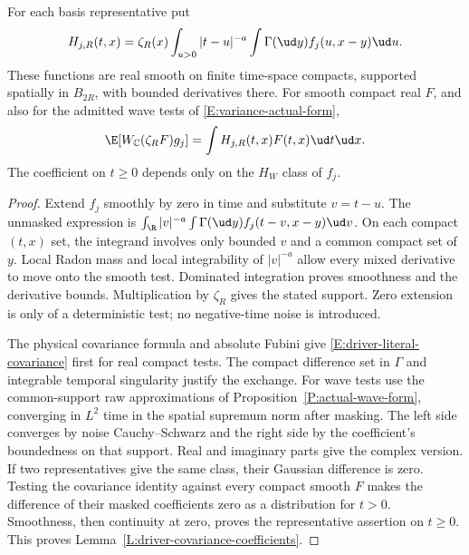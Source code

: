\begin{lemma}\label{L:driver-covariance-coefficients}
  For each basis representative put
  \begin{equation}\label{E:driver-covariance-coefficient}
    H_{j,R}(t,x)=\zeta_R(x)\int_{u>0}|t-u|^{-a}
    \int\Gamma(\ud y)f_j(u,x-y)\ud u.
  \end{equation}
  These functions are real smooth on finite time-space compacts, supported
  spatially in $B_{2R}$, with bounded derivatives there. For smooth compact
  real $F$, and also for the admitted wave tests of
  \eqref{E:variance-actual-form},
  \begin{equation}\label{E:driver-literal-covariance}
    \E[W_{\mathbb C}(\zeta_RF)g_j]
    =\int H_{j,R}(t,x)F(t,x)\ud t\ud x.
  \end{equation}
  The coefficient on $t\ge0$ depends only on the $H_W$ class of $f_j$.
\end{lemma}

\begin{proof}
  Extend $f_j$ smoothly by zero in time and substitute $v=t-u$.
  The unmasked expression is
  $\int_\R |v|^{-a}\int\Gamma(\ud y)f_j(t-v,x-y)\ud v$.
  On each compact $(t,x)$ set, the integrand involves only bounded $v$
  and a common compact set of $y$. Local Radon mass and local integrability
  of $|v|^{-a}$ allow every mixed derivative to move onto the smooth test.
  Dominated integration proves smoothness and the derivative bounds.
  Multiplication by $\zeta_R$ gives the stated support. Zero extension is
  only of a deterministic test; no negative-time noise is introduced.

  The physical covariance formula and absolute Fubini give
  \eqref{E:driver-literal-covariance} first for real compact tests. The
  compact difference set in $\Gamma$ and integrable temporal singularity
  justify the exchange. For wave tests use the common-support raw
  approximations of Proposition~\ref{P:actual-wave-form}, converging in
  $L^2$ time in the spatial supremum norm after masking. The left side
  converges by noise Cauchy--Schwarz and the right side by the coefficient's
  boundedness on that support. Real and imaginary parts give the complex
  version. If two representatives give the same class, their Gaussian
  difference is zero. Testing the covariance identity against every compact
  smooth $F$ makes the difference of their masked coefficients zero as a
  distribution for $t>0$. Smoothness, then continuity at zero, proves the
  representative assertion on $t\ge0$.
  This proves Lemma~\ref{L:driver-covariance-coefficients}.
\end{proof}

